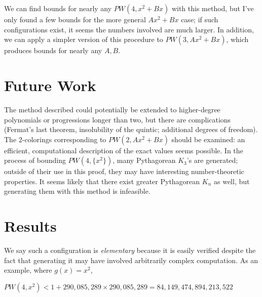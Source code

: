 \documentclass[a4paper]{amsproc}
\theoremstyle{plain}
\begin{document}
We can find bounds for nearly any $PW(4,x^2+Bx)$ with this method,
but I've only found a few bounds for the more general $Ax^2+Bx$ case;
if such configurations exist, it seems the numbers involved are much larger.
In addition, we can apply a simpler version of this procedure to $PW(3,Ax^2+Bx)$,
which produces bounds for nearly any $A, B$.

\section{Future Work}

The method described could potentially be extended to higher-degree polynomials or progressions longer than two, but there are complications
(Fermat's last theorem, insolubility of the quintic; additional degrees of freedom).
The $2$-colorings corresponding to $PW(2,Ax^2+Bx)$ should be examined: an efficient, computational description of the exact values seems possible.
In the process of bounding $PW(4, \{x^2\})$, many Pythagorean $K_3$'s are generated;
outside of their use in this proof, they may have interesting number-theoretic properties.
It seems likely that there exist greater Pythagorean $K_n$ as well, but generating them with this method is infeasible.

\section{Results}

We say such a configuration is \textit{elementary} because it is easily verified despite the fact that generating it may have involved arbitrarily complex computation.
As an example, where $g(x)=x^2$,

$ PW(4, x^2) < 1+290{,}085{,}289\times 290{,}085{,}289 = 84{,}149{,}474{,}894{,}213{,}522$
\end{document}
